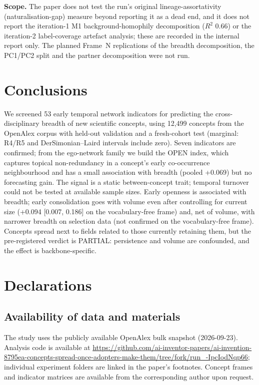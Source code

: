 \documentclass[11pt,letterpaper]{article}
\begin{document}
\textbf{Scope.} The paper does not test the run's original lineage-assortativity (naturalisation-gap) measure beyond reporting it as a dead end, and it does not report the iteration-1 M1 background-homophily decomposition ($R^2$ 0.66) or the iteration-2 label-coverage artefact analysis; these are recorded in the internal report only. The planned Frame~N replications of the breadth decomposition, the PC1/PC2 split and the partner decomposition were not run.


\section{Conclusions}
\label{sec:conclusions}

We screened 53 early temporal network indicators for predicting the cross-disciplinary breadth of new scientific concepts, using 12{,}499 concepts from the OpenAlex corpus with held-out validation and a fresh-cohort test (marginal: R4/R5 and DerSimonian--Laird intervals include zero). Seven indicators are confirmed; from the ego-network family we build the OPEN index, which captures topical non-redundancy in a concept's early co-occurrence neighbourhood and has a small association with breadth (pooled +0.069) but no forecasting gain. The signal is a static between-concept trait; temporal turnover could not be tested at available sample sizes. Early openness is associated with breadth; early consolidation goes with volume even after controlling for current size (+0.094 [0.007, 0.186] on the vocabulary-free frame) and, net of volume, with narrower breadth on selection data (not confirmed on the vocabulary-free frame). Concepts spread next to fields related to those currently retaining them, but the pre-registered verdict is PARTIAL: persistence and volume are confounded, and the effect is backbone-specific.


\section*{Declarations}

\subsection*{Availability of data and materials}
\begin{sloppypar}
The study uses the publicly available OpenAlex bulk snapshot (2026-09-23). Analysis code is available at
\url{https://github.com/ai-inventor-papers/ai-invention-8795ea-concepts-spread-once-adopters-make-them/tree/fork/run_-IpcIodNqp66};
individual experiment folders are linked in the paper's footnotes. Concept frames and indicator matrices are available from the corresponding author upon request.
\end{sloppypar}
\end{document}
